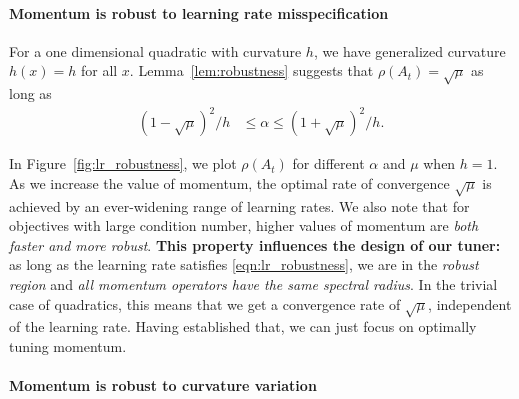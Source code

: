 \documentclass{article} %
\newcommand{\mat}[1]{\bm{\mathit{#1}}}
\begin{document}
\paragraph{Momentum is robust to learning rate misspecification}
\label{sec:lr_robustness}
For a one dimensional quadratic with curvature $h$,
we have generalized curvature $h(x)=h$ for all $x$. Lemma~\ref{lem:robustness} suggests that $\rho(\mat{A}_t)=\sqrt{\mu}$ as long as
\begin{align}
{(1-\sqrt{\mu})^2/h} &\leq \alpha \leq {(1+\sqrt{\mu})^2/h}.
\label{eqn:lr_robustness}
\end{align}

In Figure~\ref{fig:lr_robustness}, we plot $\rho(\mat{A}_t)$ for different $\alpha$ and $\mu$ when $h\!=\!1$.
As we increase the value of momentum, the optimal rate of convergence $\sqrt{\mu}$ is achieved by an ever-widening range of learning rates. 
We also note that for objectives with large condition number, higher values of momentum are {\em both faster and more robust}.
{\bf This property influences the design of our tuner:} as long as the learning rate satisfies \eqref{eqn:lr_robustness}, we are in the {\em robust region} and 
{\em all momentum operators have the same spectral radius}.
In the trivial case of quadratics, this means that we get a convergence rate of $\sqrt{\mu}$, independent of the learning rate.
Having established that, we can just focus on optimally tuning momentum.



\vspace{-0.5em}
\paragraph{Momentum is robust to curvature variation}
\label{sec:curvature_robustness}
\end{document}
